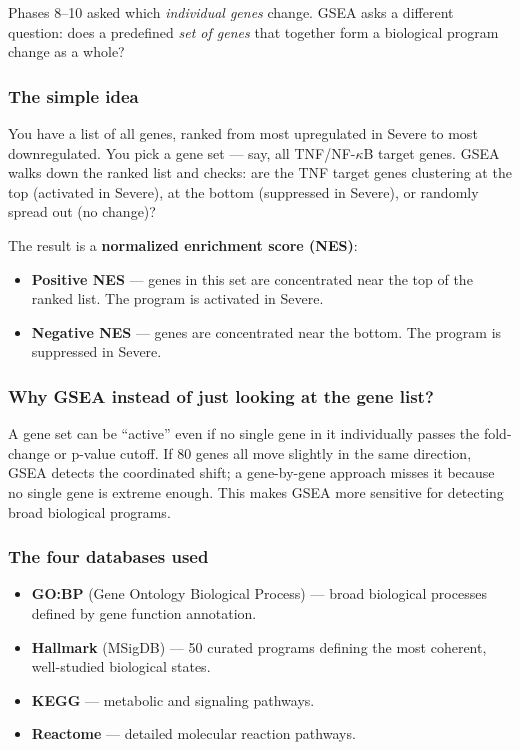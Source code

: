 \documentclass[11pt, a4paper]{article}
\begin{document}
Phases 8--10 asked which \textit{individual genes} change.
GSEA asks a different question: does a predefined \textit{set of genes}
that together form a biological program change as a whole?

\subsubsection*{The simple idea}

You have a list of all genes, ranked from most upregulated in Severe
to most downregulated. You pick a gene set — say, all TNF/NF-$\kappa$B
target genes. GSEA walks down the ranked list and checks:
are the TNF target genes clustering at the top (activated in Severe),
at the bottom (suppressed in Severe), or randomly spread out (no change)?

The result is a \textbf{normalized enrichment score (NES)}:
\begin{itemize}[nosep]
  \item \textbf{Positive NES} — genes in this set are concentrated near the
        top of the ranked list. The program is activated in Severe.
  \item \textbf{Negative NES} — genes are concentrated near the bottom.
        The program is suppressed in Severe.
\end{itemize}

\subsubsection*{Why GSEA instead of just looking at the gene list?}

A gene set can be ``active'' even if no single gene in it individually
passes the fold-change or p-value cutoff. If 80 genes all move slightly
in the same direction, GSEA detects the coordinated shift; a gene-by-gene
approach misses it because no single gene is extreme enough.
This makes GSEA more sensitive for detecting broad biological programs.

\subsubsection*{The four databases used}

\begin{itemize}[nosep]
  \item \textbf{GO:BP} (Gene Ontology Biological Process) — broad
        biological processes defined by gene function annotation.
  \item \textbf{Hallmark} (MSigDB) — 50 curated programs defining
        the most coherent, well-studied biological states.
  \item \textbf{KEGG} — metabolic and signaling pathways.
  \item \textbf{Reactome} — detailed molecular reaction pathways.
\end{itemize}
\end{document}
